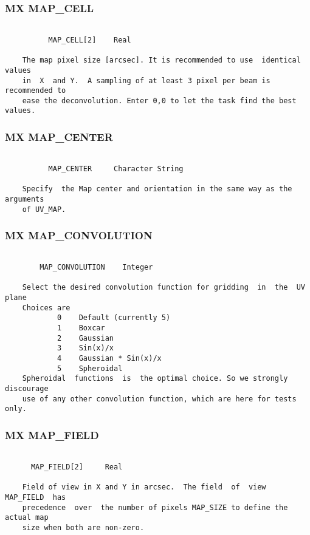 \subsubsection{MX MAP\_CELL}
\begin{verbatim}

          MAP_CELL[2]    Real

    The map pixel size [arcsec]. It is recommended to use  identical  values
    in  X  and Y.  A sampling of at least 3 pixel per beam is recommended to
    ease the deconvolution. Enter 0,0 to let the task find the best  values.

\end{verbatim}
\subsubsection{MX MAP\_CENTER}
\begin{verbatim}

          MAP_CENTER     Character String

    Specify  the Map center and orientation in the same way as the arguments
    of UV_MAP.

\end{verbatim}
\subsubsection{MX MAP\_CONVOLUTION}
\begin{verbatim}

        MAP_CONVOLUTION    Integer

    Select the desired convolution function for gridding  in  the  UV  plane
    Choices are
            0    Default (currently 5)
            1    Boxcar
            2    Gaussian
            3    Sin(x)/x
            4    Gaussian * Sin(x)/x
            5    Spheroidal
    Spheroidal  functions  is  the optimal choice. So we strongly discourage
    use of any other convolution function, which are here for tests only.

\end{verbatim}
\subsubsection{MX MAP\_FIELD}
\begin{verbatim}

      MAP_FIELD[2]     Real

    Field of view in X and Y in arcsec.  The field  of  view  MAP_FIELD  has
    precedence  over  the number of pixels MAP_SIZE to define the actual map
    size when both are non-zero.

\end{verbatim}
